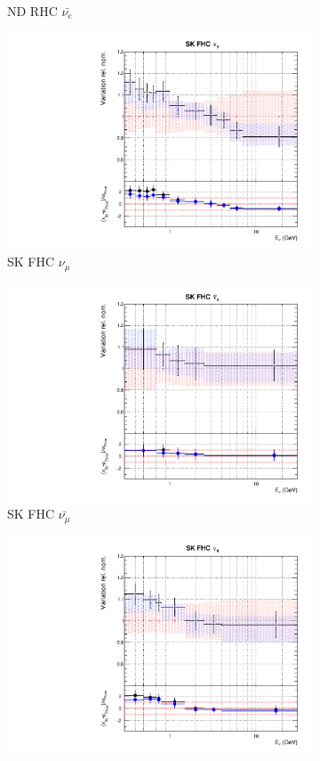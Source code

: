 \begin{figure}
\begin{subfigure}{0.24\textwidth}
  \caption{ND RHC $\bar{\nu_e}$}
\end{subfigure}
\begin{subfigure}{0.24\textwidth}
  \centering
  \includegraphics[width=0.95\linewidth]{figs/comp5q2vs8q2flux8}
  \caption{SK FHC $\nu_{\mu}$}
\end{subfigure}
\begin{subfigure}{0.24\textwidth}
  \centering
  \includegraphics[width=0.95\linewidth]{figs/comp5q2vs8q2flux9}
  \caption{SK FHC $\bar{\nu_{\mu}}$}
\end{subfigure}
\begin{subfigure}{0.24\textwidth}
  \centering
  \includegraphics[width=0.95\linewidth]{figs/comp5q2vs8q2flux10}

\end{subfigure}
\end{figure}
